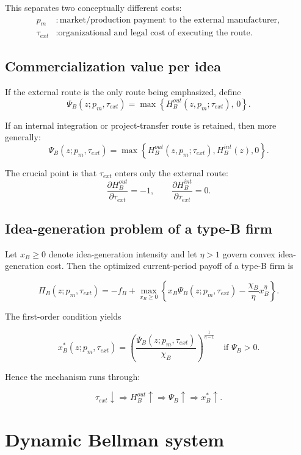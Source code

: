 \documentclass[12pt]{ctexart}
\begin{document}
This separates two conceptually different costs:
\begin{align*}
p_m & : \text{market/production payment to the external manufacturer},\\
\tau_{ext} & : \text{organizational and legal cost of executing the route.}
\end{align*}

\subsection{Commercialization value per idea}

If the external route is the only route being emphasized, define
\[
\Psi_B(z;p_m,\tau_{ext})=\max\left\{H_B^{out}(z,p_m;\tau_{ext}),\,0\right\}.
\]

If an internal integration or project-transfer route is retained, then more generally:
\[
\Psi_B(z;p_m,\tau_{ext})
=
\max\left\{
H_B^{out}(z,p_m;\tau_{ext}),
H_B^{int}(z),
0
\right\}.
\]

The crucial point is that \(\tau_{ext}\) enters only the external route:
\[
\frac{\partial H_B^{out}}{\partial \tau_{ext}}=-1,
\qquad
\frac{\partial H_B^{int}}{\partial \tau_{ext}}=0.
\]

\subsection{Idea-generation problem of a type-B firm}

Let \(x_B \ge 0\) denote idea-generation intensity and let \(\eta>1\) govern convex idea-generation cost.
Then the optimized current-period payoff of a type-B firm is

\[
\Pi_B(z;p_m,\tau_{ext})
=
-f_B
+
\max_{x_B\ge 0}
\left\{
x_B\Psi_B(z;p_m,\tau_{ext})
-\frac{\chi_B}{\eta}x_B^\eta
\right\}.
\]

The first-order condition yields

\[
x_B^*(z;p_m,\tau_{ext})
=
\left(
\frac{\Psi_B(z;p_m,\tau_{ext})}{\chi_B}
\right)^{\frac{1}{\eta-1}}
\quad \text{if } \Psi_B>0.
\]

Hence the mechanism runs through:

\[
\tau_{ext}\downarrow
\Rightarrow
H_B^{out}\uparrow
\Rightarrow
\Psi_B\uparrow
\Rightarrow
x_B^*\uparrow.
\]

\section{Dynamic Bellman system}
\end{document}
